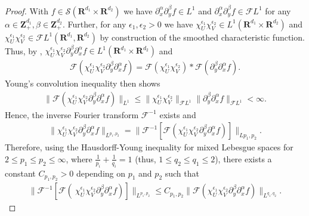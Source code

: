 \documentclass[a4paper]{article}
\newcommand{\rr}[1]{\mathbf{R}^{#1}}
\newcommand{\rrI}{\rr{d_1}}
\newcommand{\rrII}{\rr{d_2}}
\newcommand{\rrIxII}{\rrI\times\rrII}
\newcommand{\zzp}[1]{\mathbf{Z}_+^{#1}}
\newcommand{\conv}[0]{*}
\newcommand{\norm}[2]{\|#1\|_{#2}}
\newcommand{\F}[0]{\mathscr{F}}
\newcommand{\FL}[1]{\F L^{#1}}
\newcommand{\chF}[1]{\chi_{#1}}
\newcommand{\chEF}[2]{\chF{#1}^{#2}}
\numberwithin{equation}{section}
\theoremstyle{remark}
\begin{document}
\begin{proof}
    With $f \in \mathscr{S}(\rrIxII)$
    we have $\partial_x^\alpha\partial_y^\beta f\in L^1$
    and $\partial_x^\alpha\partial_y^\beta f\in \FL{1}$
    for any
    $\alpha\in  \zzp{d_1}, \beta \in \zzp{d_2}$.
    Further, for any \(\epsilon_1,\epsilon_2>0\)
    we have \(\chEF{U}{\epsilon_1}\chEF{V}{\epsilon_2}\in L^1(\rrIxII)\)
    and \(\chEF{U}{\epsilon_1}\chEF{V}{\epsilon_2}\in \FL{1}(\rrI,\rrII)\)
    by construction of the smoothed characteristic function.
    Thus, by \cite[Section 13.B, Page 316]{Jones01LebesgueIntegrationEuclidean},
    \(
        \chEF{U}{\epsilon_1}\chEF{V}{\epsilon_2}
        \partial_y^\beta\partial_x^\alpha f
        \in L^1(\rrIxII)
    \)
    and
    \begin{align}
    \label{eq:convolution_theorem}
        \mathscr{F}(\chEF{U}{\epsilon_1}\chEF{V}{\epsilon_2}\partial_y^\beta\partial_x^\alpha f)
        =\mathscr{F}(\chEF{U}{\epsilon_1}\chEF{V}{\epsilon_2})\conv\mathscr{F}(\partial_y^\beta\partial_x^\alpha f).
    \end{align}
    Young's convolution inequality then shows
    \begin{align*}
        \norm{\mathscr{F}(\chEF{U}{\epsilon_1}\chEF{V}{\epsilon_2}\partial_y^\beta\partial_x^\alpha f)}{L^1}
        \leq\norm{\chEF{U}{\epsilon_1}\chEF{V}{\epsilon_2}}{\FL{1}}\norm{\partial_y^\beta\partial_x^\alpha f}{\FL{1}}<\infty.
    \end{align*}
    Hence, the inverse Fourier transform $\mathscr{F}^{-1}$ exists and 
    \begin{align*}
        \|\chEF{U}{\epsilon_1}\chEF{V}{\epsilon_2}
        \partial_y^\beta\partial_x^\alpha f\|_{L^{p_1,p_2}}
        = 
        \|\mathscr {F}^{-1}\left[\mathscr {F}\left(\chEF{U}{\epsilon_1}\chEF{V}{\epsilon_2} {\partial_y^\beta\partial_x^\alpha f}\right)\right]\|
                _{L{p_1,p_2}}.
    \end{align*}
    Therefore, using the Hausdorff-Young inequality for mixed Lebesgue spaces \cite[Section 12]{Benedek61SpaceMixedNorm} for $2\leq p_1\leq p_2\leq \infty$,
    where $\frac{1}{p_i} + \frac{1}{q_i} = 1$ (thus, $1\leq q_2\leq q_1\leq 2$),
    there exists a constant $C_{p_1,p_2}>0$
    depending on $p_1$ and $p_2$ such that
    \begin{align}
    \label{eq:hausdorff_young}
        \norm{\mathscr {F}^{-1}\left[\mathscr {F}\left(\
        \chEF{U}{\epsilon_1}\chEF{V}{\epsilon_2}
        {\partial_y^\beta\partial_x^\alpha f}
        \right)\right]}{L^{p_1,p_2}}
        \leq C_{p_1,p_2}
        \norm{\mathscr{F}\left(\chEF{U}{\epsilon_1}\chEF{V}{\epsilon_2}
        {\partial_y^\beta\partial_x^\alpha f}\right)}{L^{q_1,q_2}}.
    \end{align}
    

\end{proof}
\end{document}
